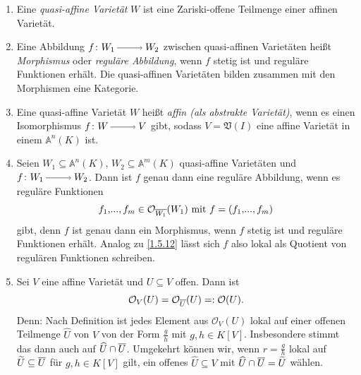 \documentclass[a4paper,12pt,index=toc]{scrbook}
\theoremstyle{keinenummern} %
\def\A{\mathbb{A}}
\def\V{\mathfrak{V}}
\def\O{\mathcal{O}}
\renewcommand{\dotsc}{\ensuremath{\!...}}
\newcommand{\schlange}[1]{\widetilde{#1}}
\newcommand{\dach}{\widehat}
\def\Bar#1{\ensuremath\overline{#1}}
\begin{document}
\begin{db}\label{1.5.14}
  \begin{enumerate}
  \item{} Eine \emph{quasi-affine Varietät} $W$ ist eine Zariski-offene Teilmenge einer affinen Varietät.
  \item{} Eine Abbildung $f\colon W_1\ra W_2$ zwischen quasi-affinen Varietäten heißt \emph{Morphismus} oder \emph{reguläre Abbildung}, wenn $f$
    stetig ist und reguläre Funktionen erhält. Die quasi-affinen Varietäten bilden zusammen mit den Morphismen eine Kategorie.
  \item{} Eine quasi-affine Varietät $W$ heißt \emph{affin (als abstrakte Varietät)}, wenn es einen Isomorphismus
    $f\colon W\ra V$ gibt, sodass $V=\V(I)$ eine affine Varietät in einem $\A^n(K)$ ist.
    \item{} Seien $W_{1}\subseteq\A^{n}(K)$, $W_{2}\subseteq\A^{m}(K)$ quasi-affine Varietäten und $f\colon W_{1}\ra W_{2}$. Dann ist $f$ genau dann eine reguläre Abbildung, wenn es reguläre Funktionen 
    \begin{equation*}f_{1},\dotsc,f_{m}\in\O_{\Bar{W_{1}}}(W_{1})\text{ mit }f=(f_{1},\dotsc,f_{m})\end{equation*}
    gibt, denn $f$ ist genau dann ein Morphismus, wenn $f$ stetig ist und reguläre Funktionen erhält. Analog zu \cref{1.5.12} lässt sich $f$ also lokal als Quotient von regulären Funktionen schreiben. 
    \item Sei $V$ eine affine Varietät und $U\subseteq V$ offen. Dann ist
    \begin{equation*}\O_{V}(U)=\O_{\Bar{U}}(U)=:\O(U).\end{equation*}
    Denn: Nach Definition ist jedes Element aus $\O_{V}(U)$ lokal auf einer offenen Teilmenge $\dach{U}$ von $V$ von der Form $\frac{g}{h}$ mit $g,h\in K[V]$. Insbesondere stimmt das dann auch auf $\dach{U}\cap\Bar{U}$. Umgekehrt können wir, wenn $r=\frac{g}{h}$ lokal auf $\schlange{U}\subseteq\Bar{U}$ für $g,h\in K[V]$ gilt, ein offenes $\dach{U}\subseteq V$ mit $\dach{U}\cap\Bar{U}=\schlange{U}$ wählen.
  \end{enumerate}
\end{db}
\end{document}
